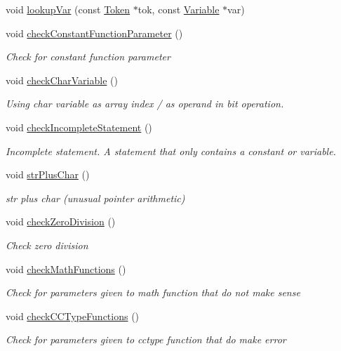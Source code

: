 \begin{DoxyCompactItemize}
void \hyperlink{class_check_other_a50fc19b30e6c5f7d5a4e5f203b97e688}{lookup\-Var} (const \hyperlink{class_token}{Token} $\ast$tok, const \hyperlink{class_variable}{Variable} $\ast$var)
\item 
void \hyperlink{class_check_other_a2ffbb4ce325c32ceb796265af482af62}{check\-Constant\-Function\-Parameter} ()
\begin{DoxyCompactList}\small\item\em Check for constant function parameter \end{DoxyCompactList}\item 
void \hyperlink{class_check_other_a424f217967119a37985df2615e2f2616}{check\-Char\-Variable} ()
\begin{DoxyCompactList}\small\item\em Using char variable as array index / as operand in bit operation. \end{DoxyCompactList}\item 
void \hyperlink{class_check_other_af9be20e48c0915b8c9a5fe2c47e9a905}{check\-Incomplete\-Statement} ()
\begin{DoxyCompactList}\small\item\em Incomplete statement. A statement that only contains a constant or variable. \end{DoxyCompactList}\item 
void \hyperlink{class_check_other_a61bef9a40729ca203432a5c243de6c3f}{str\-Plus\-Char} ()
\begin{DoxyCompactList}\small\item\em str plus char (unusual pointer arithmetic) \end{DoxyCompactList}\item 
void \hyperlink{class_check_other_a9e3e6d91a89fb71585872113b0ccece5}{check\-Zero\-Division} ()
\begin{DoxyCompactList}\small\item\em Check zero division \end{DoxyCompactList}\item 
void \hyperlink{class_check_other_a958ebb704a55a5bf3017df17cb8e9f0b}{check\-Math\-Functions} ()
\begin{DoxyCompactList}\small\item\em Check for parameters given to math function that do not make sense \end{DoxyCompactList}\item 
void \hyperlink{class_check_other_aabef02da314ed9a7fda6d423c99da8f1}{check\-C\-C\-Type\-Functions} ()
\begin{DoxyCompactList}\small\item\em Check for parameters given to cctype function that do make error \end{DoxyCompactList}\item 

\end{DoxyCompactItemize}
